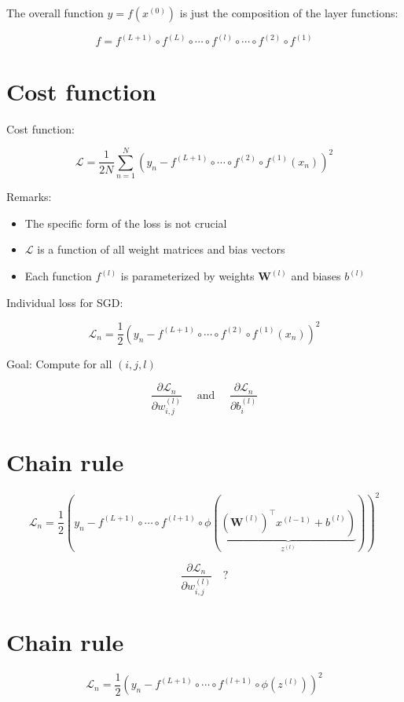 The overall function $y=f\left(x^{(0)}\right)$ is just the composition of the layer functions:

$$
f=f^{(L+1)} \circ f^{(L)} \circ \cdots \circ f^{(l)} \circ \cdots \circ f^{(2)} \circ f^{(1)}
$$

\section*{Cost function}
Cost function:

$$
\mathscr{L}=\frac{1}{2 N} \sum_{n=1}^{N}\left(y_{n}-f^{(L+1)} \circ \cdots \circ f^{(2)} \circ f^{(1)}\left(x_{n}\right)\right)^{2}
$$

Remarks:

\begin{itemize}
  \item The specific form of the loss is not crucial
  \item $\mathscr{L}$ is a function of all weight matrices and bias vectors
  \item Each function $f^{(l)}$ is parameterized by weights $\mathbf{W}^{(l)}$ and biases $b^{(l)}$
\end{itemize}

Individual loss for SGD:

$$
\mathscr{L}_{n}=\frac{1}{2}\left(y_{n}-f^{(L+1)} \circ \cdots \circ f^{(2)} \circ f^{(1)}\left(x_{n}\right)\right)^{2}
$$

Goal: Compute for all $(i, j, l)$

$$
\frac{\partial \mathscr{L}_{n}}{\partial w_{i, j}^{(l)}} \quad \text { and } \quad \frac{\partial \mathscr{L}_{n}}{\partial b_{i}^{(l)}}
$$

\section*{Chain rule}
$$
\mathscr{L}_{n}=\frac{1}{2}\left(y_{n}-f^{(L+1)} \circ \cdots \circ f^{(l+1)} \circ \phi(\underbrace{\left.\left(\mathbf{W}^{(l)}\right)^{\top} x^{(l-1)}+b^{(l)}\right)}_{z^{(l)}})\right)^{2}
$$



$$
\frac{\partial \mathscr{L}_{n}}{\partial w_{i, j}^{(l)}} \quad ?
$$

\section*{Chain rule}
$$
\mathscr{L}_{n}=\frac{1}{2}\left(y_{n}-f^{(L+1)} \circ \cdots \circ f^{(l+1)} \circ \phi\left(z^{(l)}\right)\right)^{2}
$$

